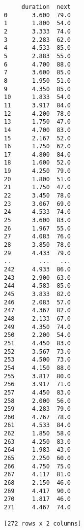 \documentclass[11pt]{article}
\begin{document}
    
    \begin{verbatim}
     duration  next
0       3.600  79.0
1       1.800  54.0
2       3.333  74.0
3       2.283  62.0
4       4.533  85.0
5       2.883  55.0
6       4.700  88.0
7       3.600  85.0
8       1.950  51.0
9       4.350  85.0
10      1.833  54.0
11      3.917  84.0
12      4.200  78.0
13      1.750  47.0
14      4.700  83.0
15      2.167  52.0
16      1.750  62.0
17      4.800  84.0
18      1.600  52.0
19      4.250  79.0
20      1.800  51.0
21      1.750  47.0
22      3.450  78.0
23      3.067  69.0
24      4.533  74.0
25      3.600  83.0
26      1.967  55.0
27      4.083  76.0
28      3.850  78.0
29      4.433  79.0
..        ...   ...
242     4.933  86.0
243     2.900  63.0
244     4.583  85.0
245     3.833  82.0
246     2.083  57.0
247     4.367  82.0
248     2.133  67.0
249     4.350  74.0
250     2.200  54.0
251     4.450  83.0
252     3.567  73.0
253     4.500  73.0
254     4.150  88.0
255     3.817  80.0
256     3.917  71.0
257     4.450  83.0
258     2.000  56.0
259     4.283  79.0
260     4.767  78.0
261     4.533  84.0
262     1.850  58.0
263     4.250  83.0
264     1.983  43.0
265     2.250  60.0
266     4.750  75.0
267     4.117  81.0
268     2.150  46.0
269     4.417  90.0
270     1.817  46.0
271     4.467  74.0

[272 rows x 2 columns]
    \end{verbatim}
\end{document}
